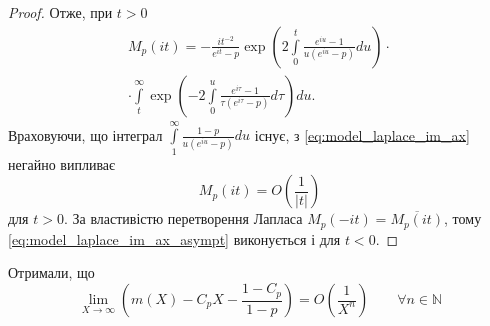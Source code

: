 \begin{lem}
\begin{proof}
Отже, при $t>0$
\begin{equation}
\label{eq:model_laplace_im_ax}
\begin{split}
M_{p}(it) = -\frac{i t^{-2}}{e^{it}-p} \exp \left(2 \int\limits_{0}^{t} \frac{e^{iu} -1}{u(e^{iu} - p)} du\right) \cdot \\
\cdot \int\limits_t^\infty \exp\left(-2 \int\limits_{0}^{u} \frac{e^{i\tau} -1}{\tau(e^{i\tau} - p)} d\tau\right) du.
\end{split}
\end{equation}
Враховуючи, що інтеграл $\int\limits_{1}^{\infty} \frac{1-p}{u(e^{iu} - p)} du$ існує, з \eqref{eq:model_laplace_im_ax} негайно випливає
\begin{equation}
\label{eq:model_laplace_im_ax_asympt}
M_{p}(it) = O\left(\frac{1}{|t|}\right)
\end{equation}
для $t > 0$. За властивістю перетворення Лапласа $M_{p}(-it) = \overline{M_{p}(it)}$, тому \eqref{eq:model_laplace_im_ax_asympt} виконується і для $t < 0$.
\end{proof}
\end{lem}

Отримали, що
\begin{equation}
\label{eq:uniform_right_as_enhanced}
\lim\limits_{X \rightarrow \infty} \left( m(X) - C_{p} X - \frac{1 - C_{p}}{1 - p} \right) = O\left(\frac{1}{X^{n}}\right) \qquad \forall n \in \mathbb{N}
\end{equation}
